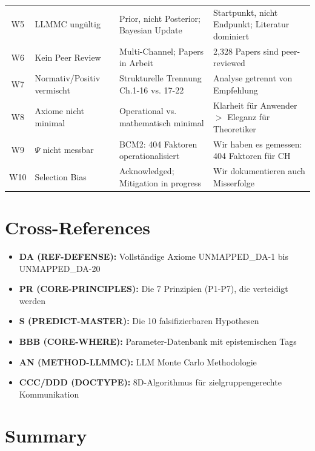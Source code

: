 \begin{table}[htbp]
\begin{tabular}{@{}clp{4cm}p{4cm}@{}}
W5 & LLMMC ungültig & Prior, nicht Posterior; Bayesian Update & Startpunkt, nicht Endpunkt; Literatur dominiert \\
W6 & Kein Peer Review & Multi-Channel; Papers in Arbeit & 2,328 Papers sind peer-reviewed \\
W7 & Normativ/Positiv vermischt & Strukturelle Trennung Ch.1-16 vs. 17-22 & Analyse getrennt von Empfehlung \\
W8 & Axiome nicht minimal & Operational vs. mathematisch minimal & Klarheit für Anwender $>$ Eleganz für Theoretiker \\
W9 & $\Psi$ nicht messbar & BCM2: 404 Faktoren operationalisiert & Wir haben es gemessen: 404 Faktoren für CH \\
W10 & Selection Bias & Acknowledged; Mitigation in progress & Wir dokumentieren auch Misserfolge \\
\bottomrule
\end{tabular}
\end{table}

\section{Cross-References}
\label{sec:da2-crossref}

\begin{itemize}[nosep]
    \item \textbf{DA (REF-DEFENSE):} Vollständige Axiome UNMAPPED_DA-1 bis UNMAPPED_DA-20
    \item \textbf{PR (CORE-PRINCIPLES):} Die 7 Prinzipien (P1-P7), die verteidigt werden
    \item \textbf{S (PREDICT-MASTER):} Die 10 falsifizierbaren Hypothesen
    \item \textbf{BBB (CORE-WHERE):} Parameter-Datenbank mit epistemischen Tags
    \item \textbf{AN (METHOD-LLMMC):} LLM Monte Carlo Methodologie
    \item \textbf{CCC/DDD (DOCTYPE):} 8D-Algorithmus für zielgruppengerechte Kommunikation
\end{itemize}

\section{Summary}
\label{sec:da2-summary}

